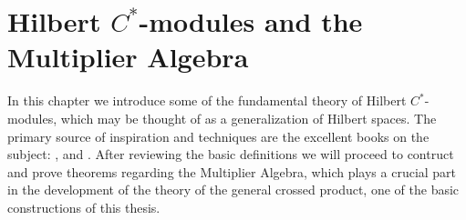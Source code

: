 \chapter{Hilbert $C^*$-modules and the Multiplier Algebra}
In this chapter we introduce some of the fundamental theory of Hilbert $C^*$-modules, which may be thought of as a generalization of Hilbert spaces. The primary source of inspiration and techniques are the excellent books on the subject: \cite{williamsmorita}, \cite{lance1995hilbert} and \cite{murphy2014c}. After reviewing the basic definitions we will proceed to contruct and prove theorems regarding the Multiplier Algebra, which plays a crucial part in the development of the theory of the general crossed product, one of the basic constructions of this thesis.



